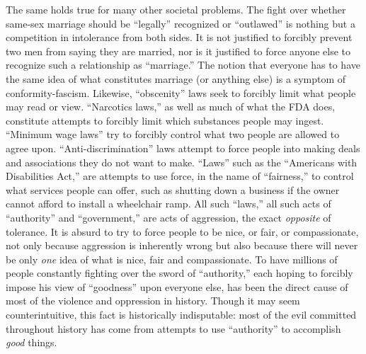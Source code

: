 \documentclass{book}
\begin{document}
The same holds true for many other societal problems. The fight over whether same-sex marriage should be \enquote{legally} recognized or \enquote{outlawed} is nothing but a competition in intolerance from both sides. It is not justified to forcibly prevent two men from saying they are married, nor is it justified to force anyone else to recognize such a relationship as \enquote{marriage.} The notion that everyone has to have the same idea of what constitutes marriage (or anything else) is a symptom of conformity-fascism. Likewise, \enquote{obscenity} laws seek to forcibly limit what people may read or view. \enquote{Narcotics laws,} as well as much of what the FDA does, constitute attempts to forcibly limit which substances people may ingest. \enquote{Minimum wage laws} try to forcibly control what two people are allowed to agree upon. \enquote{Anti-discrimination} laws attempt to force people into making deals and associations they do not want to make. \enquote{Laws} such as the \enquote{Americans with Disabilities Act,} are attempts to use force, in the name of \enquote{fairness,} to control what services people can offer, such as shutting down a business if the owner cannot afford to install a wheelchair ramp. All such \enquote{laws,} all such acts of \enquote{authority} and \enquote{government,} are acts of aggression, the exact \emph{opposite} of tolerance. It is absurd to try to force people to be nice, or fair, or compassionate, not only because aggression is inherently wrong but also because there will never be only \emph{one} idea of what is nice, fair and compassionate. To have millions of people constantly fighting over the sword of \enquote{authority,} each hoping to forcibly impose his view of \enquote{goodness} upon everyone else, has been the direct cause of most of the violence and oppression in history. Though it may seem counterintuitive, this fact is historically indisputable: most of the evil committed throughout history has come from attempts to use \enquote{authority} to accomplish \emph{good} things.
\end{document}
